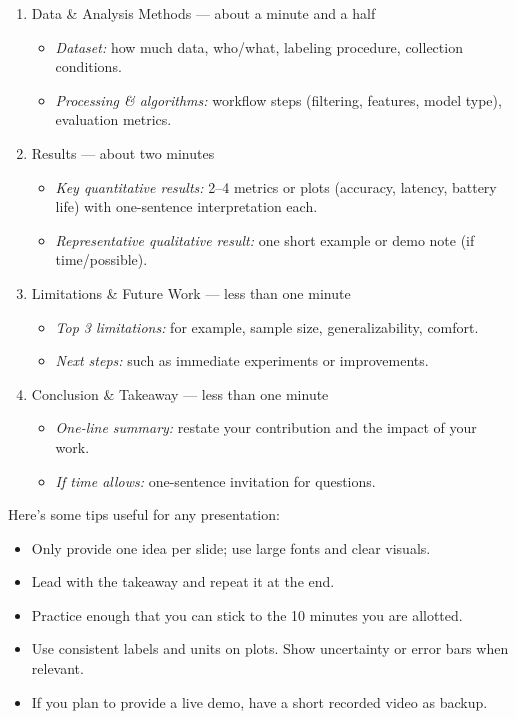 \documentclass[11pt]{article}
\begin{document}
\begin{enumerate}
	\item Data \& Analysis Methods — about a minute and a half
	\begin{itemize}
		\item {\em Dataset:} how much data, who/what, labeling procedure, collection conditions.
		\item {\em Processing \& algorithms:} workflow steps (filtering, features, model type), evaluation metrics.
	\end{itemize}
	\item Results — about two minutes
	\begin{itemize}
		\item {\em Key quantitative results:} 2–4 metrics or plots (accuracy, latency, battery life) with one-sentence interpretation each.
		\item {\em Representative qualitative result:} one short example or demo note (if time/possible).
	\end{itemize}
	\item Limitations \& Future Work — less than one minute
	\begin{itemize}
		\item {\em Top 3 limitations:} for example, sample size, generalizability, comfort.
		\item {\em Next steps:} such as immediate experiments or improvements.
	\end{itemize}
	\item Conclusion \& Takeaway — less than one minute
	\begin{itemize}
		\item {\em One-line summary:} restate your contribution and the impact of your work.
		\item {\em If time allows:} one-sentence invitation for questions.
	\end{itemize}	
\end{enumerate}

Here's some tips useful for any presentation:
\begin{itemize}
	\item Only provide one idea per slide; use large fonts and clear visuals.
	\item Lead with the takeaway and repeat it at the end.
	\item Practice enough that you can stick to the 10 minutes you are allotted.
	\item Use consistent labels and units on plots. Show uncertainty or error bars when relevant.
	\item If you plan to provide a live demo, have a short recorded video as backup.
\end{itemize}
\end{document}
